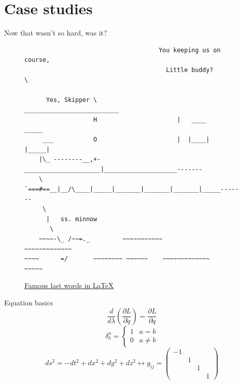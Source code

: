 \documentclass{beamer}
\theoremstyle{definition}
\theoremstyle{remark}
\begin{document}
\section{Case studies}

\begin{frame}[fragile]{Now that wasn't so hard, was it?}
\begin{figure}[H]
\centering
{\scriptsize
\begin{verbatim}
                                     You keeping us on course,
                                       Little buddy?           \

      Yes, Skipper \                       __________________________
                   H                      |   ____     _____
     ___           O                      |  |____|   |_____|
    |\_ --------__,+-_____________________|____________________-------
    \  `===#==__|__/\____|_____|_______|_______|_______|_____-------
     \
      |   ss. minnow
       \
    ~~~~-\_ /~~=._         ~~~~~~~~~~~             ~~~~~~~~~~~~~
~~~~      =/       ~~~~~~~~ ~~~~~~    ~~~~~~~~~~~~~             ~~~~~
\end{verbatim}}
\caption{\href{https://www.youtube.com/watch?v=b4qRp4OfUn8&t=263s}{Famous last words in {\LaTeX}}}
\end{figure}
\end{frame}
\begin{frame}{Equation basics}
$$\frac{d}{d\lambda}\left(\frac{\partial L}{\partial\dot{q}}\right)=\frac{\partial L}{\partial q}$$
$$\delta^a_b=\begin{cases}1&a=b\\0&a\ne b\end{cases}$$
$$ds^2=-dt^2+dx^2+dy^2+dz^2\leftrightarrow g_{ij}=\begin{pmatrix}-1&&&\\&1&&\\&&1&\\&&&1\end{pmatrix}$$
\end{frame}
\end{document}

